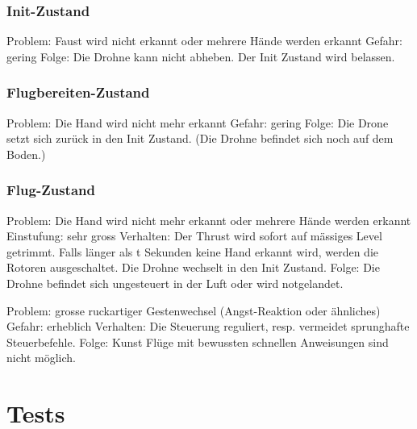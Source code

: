 \subsubsection{Init-Zustand}
Problem:        Faust wird nicht erkannt oder mehrere Hände werden erkannt
Gefahr:        gering
Folge:                Die Drohne kann nicht abheben. Der Init Zustand wird belassen.

\subsubsection{Flugbereiten-Zustand}
Problem:        Die Hand wird nicht mehr erkannt
Gefahr:        gering
Folge:                Die Drone setzt sich zurück in den Init Zustand. (Die Drohne befindet sich noch auf dem Boden.)

\subsubsection{Flug-Zustand}
Problem:        Die Hand wird nicht mehr erkannt oder mehrere Hände werden erkannt
Einstufung:        sehr gross
Verhalten:        Der Thrust wird sofort auf mässiges Level getrimmt. Falls länger als t Sekunden keine Hand erkannt wird, werden die Rotoren ausgeschaltet. Die Drohne wechselt in den Init Zustand.
Folge:                Die Drohne befindet sich ungesteuert in der Luft oder wird notgelandet.

Problem:        grosse ruckartiger Gestenwechsel (Angst-Reaktion oder ähnliches)
Gefahr:        erheblich
Verhalten:        Die Steuerung reguliert, resp. vermeidet sprunghafte Steuerbefehle.
Folge:                Kunst Flüge mit bewussten schnellen Anweisungen sind nicht möglich.

\section{Tests}


